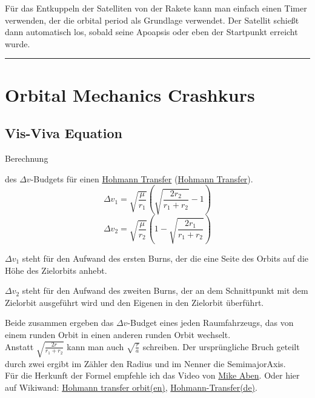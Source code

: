 \documentclass[12pt,paper=A4,numbers=noenddot,bibliography=totoc,listof=totoc,DIV=11,BCOR=1mm]{scrreprt}
\begin{document}
Für das Entkuppeln der Satelliten von der Rakete kann man einfach einen Timer verwenden, der die orbital period als Grundlage verwendet. Der Satellit schießt dann automatisch los, sobald seine Apoapsis oder eben der Startpunkt erreicht wurde.\\

\noindent
{\color{black} \rule{\linewidth}{0.1mm} }


\chapter{Orbital Mechanics Crashkurs}
\section{Vis-Viva Equation}
\hypertarget{visviva}{Berechnung} des $\Delta v$-Budgets für einen \href{https://forum.kerbalspaceprogram.com/index.php?/topic/83437-illustrated-tutorial-for-orbital-rendezvous/}{Hohmann Transfer} (\href{https://imgur.com/a/DmGTv}{Hohmann Transfer}).
\begin{equation}
\label{eq:visviva1}
\Delta v_{1} = \sqrt{\frac{\mu}{r_{1}}} \left( \sqrt{\frac{2r_{2}}{r_{1}+r_{2}}}-1 \right)
\end{equation}
\begin{equation}
\label{eq:visviva2}
\Delta v_{2} = \sqrt{\frac{\mu}{r_{2}}} \left( 1-\sqrt{\frac{2r_{1}}{r_{1}+r_{2}}} \right)
\end{equation}

$\Delta v_{1}$ steht für den Aufwand des ersten Burns, der die eine Seite des Orbits auf die Höhe des Zielorbits anhebt.

$\Delta v_{2}$ steht für den Aufwand des zweiten Burns, der an dem Schnittpunkt mit dem Zielorbit ausgeführt wird und den Eigenen in den Zielorbit überführt.

Beide zusammen ergeben das $\Delta v$-Budget eines jeden Raumfahrzeugs, das von einem runden Orbit in einen anderen runden Orbit wechselt. \\
Anstatt $\sqrt{\frac{2r}{r_{1}+r_{2}}}$ kann man auch $\sqrt{\frac{r}{a}}$ schreiben. Der ursprüngliche Bruch geteilt durch zwei ergibt im Zähler den Radius und im Nenner die SemimajorAxis.\\
Für die Herkunft der Formel empfehle ich das Video von \href{https://youtu.be/7AkakB5TOSw}{Mike Aben}.
Oder hier auf Wikiwand: \href{https://www.wikiwand.com/en/Hohmann_transfer_orbit}{Hohmann transfer orbit(en)}, \href{https://www.wikiwand.com/de/Hohmann-Transfer}{Hohmann-Transfer(de)}.
\end{document}
